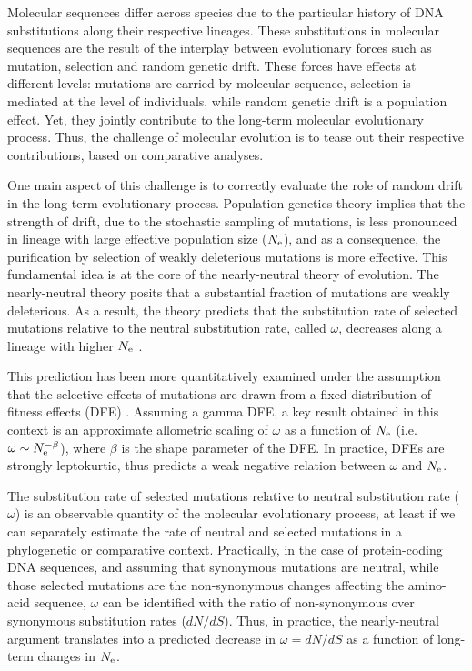\documentclass{article}
\begin{document}
	Molecular sequences differ across species due to the particular history of DNA substitutions along their respective lineages.
	These substitutions in molecular sequences are the result of the interplay between evolutionary forces such as mutation, selection and random genetic drift.
	These forces have effects at different levels: mutations are carried by molecular sequence, selection is mediated at the level of individuals, while random genetic drift is a population effect.
	Yet, they jointly contribute to the long-term molecular evolutionary process.
	Thus, the challenge of molecular evolution is to tease out their respective contributions, based on comparative analyses.
	
	One main aspect of this challenge is to correctly evaluate the role of random drift in the long term evolutionary process.
	Population genetics theory implies that the strength of drift, due to the stochastic sampling of mutations, is less pronounced in lineage with large effective population size ($N_{\mathrm{e}}$), and as a consequence, the purification by selection of weakly deleterious mutations is more effective.
	This fundamental idea is at the core of the nearly-neutral theory of evolution.
	The nearly-neutral theory posits that a substantial fraction of mutations are weakly deleterious.
	As a result, the theory predicts that the substitution rate of selected mutations relative to the neutral substitution rate, called $\omega$, decreases along a lineage with higher $N_{\mathrm{e}}$ \cite{Ohta1972, Ohta1992}.
	
	This prediction has been more quantitatively examined under the assumption that the selective effects of mutations are drawn from a fixed distribution of fitness effects (DFE) \cite{Kimura1979, Welch2008}.
	Assuming a gamma DFE, a key result obtained in this context is an approximate allometric scaling of $\omega$ as a function of $N_{\mathrm{e}}$ (i.e. $\omega \sim N_{\mathrm{e}}^{-\beta}$), where $\beta$ is the shape parameter of the DFE.
	In practice, DFEs are strongly leptokurtic, thus predicts a weak negative relation between $\omega$ and $N_{\mathrm{e}}$.
	
	The substitution rate of selected mutations relative to neutral substitution rate ($\omega$) is an observable quantity of the molecular evolutionary process, at least if we can separately estimate the rate of neutral and selected mutations in a phylogenetic or comparative context.
	Practically, in the case of protein-coding DNA sequences, and assuming that synonymous mutations are neutral, while those selected mutations are the non-synonymous changes affecting the amino-acid sequence, $\omega$ can be identified with the ratio of non-synonymous over synonymous substitution rates ($dN/dS$).
	Thus, in practice, the nearly-neutral argument translates into a predicted decrease in $\omega = dN/dS$ as a function of long-term changes in $N_{\mathrm{e}}$.
	
\end{document}
